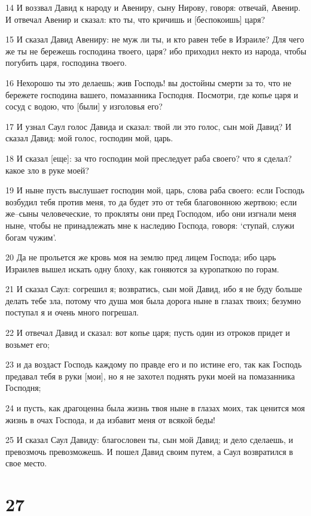\par 14 И воззвал Давид к народу и Авениру, сыну Нирову, говоря: отвечай, Авенир. И отвечал Авенир и сказал: кто ты, что кричишь и [беспокоишь] царя?
\par 15 И сказал Давид Авениру: не муж ли ты, и кто равен тебе в Израиле? Для чего же ты не бережешь господина твоего, царя? ибо приходил некто из народа, чтобы погубить царя, господина твоего.
\par 16 Нехорошо ты это делаешь; жив Господь! вы достойны смерти за то, что не бережете господина вашего, помазанника Господня. Посмотри, где копье царя и сосуд с водою, что [были] у изголовья его?
\par 17 И узнал Саул голос Давида и сказал: твой ли это голос, сын мой Давид? И сказал Давид: мой голос, господин мой, царь.
\par 18 И сказал [еще]: за что господин мой преследует раба своего? что я сделал? какое зло в руке моей?
\par 19 И ныне пусть выслушает господин мой, царь, слова раба своего: если Господь возбудил тебя против меня, то да будет это от тебя благовонною жертвою; если же--сыны человеческие, то прокляты они пред Господом, ибо они изгнали меня ныне, чтобы не принадлежать мне к наследию Господа, говоря: `ступай, служи богам чужим'.
\par 20 Да не прольется же кровь моя на землю пред лицем Господа; ибо царь Израилев вышел искать одну блоху, как гоняются за куропаткою по горам.
\par 21 И сказал Саул: согрешил я; возвратись, сын мой Давид, ибо я не буду больше делать тебе зла, потому что душа моя была дорога ныне в глазах твоих; безумно поступал я и очень много погрешал.
\par 22 И отвечал Давид и сказал: вот копье царя; пусть один из отроков придет и возьмет его;
\par 23 и да воздаст Господь каждому по правде его и по истине его, так как Господь предавал тебя в руки [мои], но я не захотел поднять руки моей на помазанника Господня;
\par 24 и пусть, как драгоценна была жизнь твоя ныне в глазах моих, так ценится моя жизнь в очах Господа, и да избавит меня от всякой беды!
\par 25 И сказал Саул Давиду: благословен ты, сын мой Давид; и дело сделаешь, и превозмочь превозможешь. И пошел Давид своим путем, а Саул возвратился в свое место.

\chapter{27}

